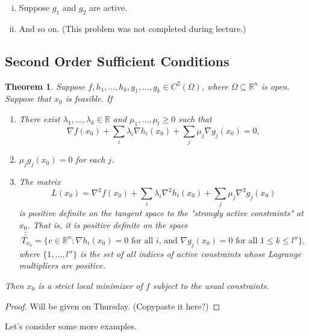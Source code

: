 \documentclass[11pt]{article}
\newcommand{\R}{\mathbb{R}}
\newtheorem{theorem}{Theorem}[subsection]
\begin{document}
\begin{enumerate}
\begin{enumerate}[(i)]
\item
Suppose $g_1$ and $g_2$ are active.

\item
And so on. (This problem was not completed during lecture.)
\end{enumerate}
\end{enumerate}

\subsection{Second Order Sufficient Conditions}

\begin{theorem}
Suppose $f, h_1, \dots, h_k, g_1, \dots, g_k \in C^2(\Omega)$, where $\Omega \subseteq \R^n$ is open. Suppose that $x_0$ is feasible. If
\begin{enumerate}
\item
There exist $\lambda_1, \dots, \lambda_k \in \R$ and $\mu_1, \dots, \mu_l \geq 0$ such that
\[
\nabla f(x_0) + \sum_i \lambda_i \nabla h_i(x_0) + \sum_j \mu_j \nabla g_j(x_0) = 0,
\]

\item
$\mu_j g_j(x_0) = 0$ for each $j$.

\item
The matrix
\[
L(x_0) = \nabla^2 f(x_0) + \sum_i \lambda_i \nabla^2 h_i(x_0) + \sum_j \mu_j \nabla^2 g_j(x_0)
\]
is positive definite on the tangent space to the "strongly active constraints" at $x_0$. That is, it is positive definite on the space
\[
\tilde{\tilde{T_{x_0}}} = \{ v \in \R^n : \nabla h_i(x_0) = 0 \text{ for all $i$, and } \nabla g_j(x_0) = 0 \text{ for all $1 \leq k \leq l''$} \},
\]
where $\{1, \dots, l''\}$ is the set of all indices of active constraints whose Lagrange multipliers are positive.
\end{enumerate}
Then $x_0$ is a strict local minimizer of $f$ subject to the usual constraints.
\end{theorem}
\begin{proof}
Will be given on Thursday. (Copypaste it here?)
\end{proof}

Let's consider some more examples.
\end{document}

